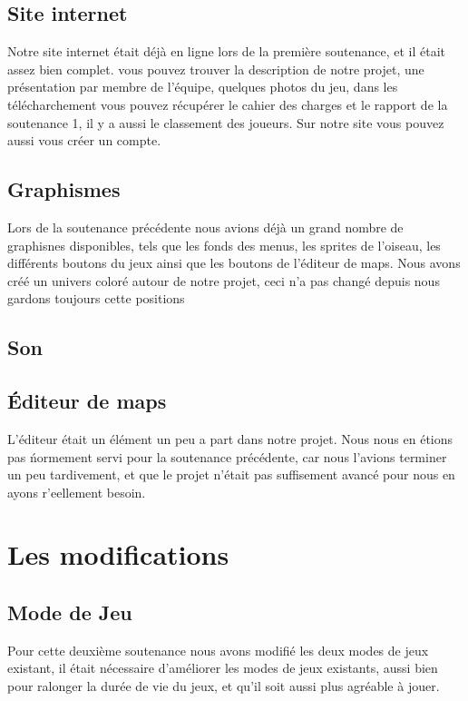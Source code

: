 \documentclass [11pt]{report}
\begin{document}
	\section{Site internet}
		Notre site internet \'etait d\'ej\`a en ligne lors de la premi\`ere soutenance, et il \'etait assez bien complet. vous pouvez trouver la description de notre projet, une pr\'esentation par membre de l'\'equipe, quelques photos du jeu, dans les t\'el\'echarchement vous pouvez r\'ecup\'erer le cahier des charges et le rapport de la soutenance 1, il y a aussi le classement des joueurs. Sur notre site vous pouvez aussi vous cr\'eer un compte.
	\section{Graphismes}
		Lors de la soutenance pr\'ec\'edente nous avions d\'ej\`a un grand nombre de graphisnes disponibles, tels que les fonds des menus, les sprites de l'oiseau, les diff\'erents boutons du jeux ainsi que les boutons de l'\'editeur de maps. Nous avons cr\'e\'e un univers color\'e autour de notre projet, ceci n'a pas chang\'e depuis nous gardons toujours cette positions 
	\section{Son}
	\section{\'Editeur de maps}
		L'\'editeur \'etait un \'el\'ement un peu a part dans notre projet. Nous nous en \'etions pas \'normement servi pour la soutenance pr\'ec\'edente, car nous l'avions terminer un peu tardivement, et que le projet n'\'etait pas suffisement avanc\'e pour nous en ayons r'eellement besoin.
\chapter{Les modifications}
	\section{Mode de Jeu}
		Pour cette deuxi\`eme soutenance nous avons modifi\'e les deux modes de jeux existant, il \'etait n\'ecessaire d'am\'eliorer les modes de jeux existants, aussi bien pour ralonger la dur\'ee de vie du jeux, et qu'il soit aussi plus agr\'eable \`a jouer.
\end{document}
